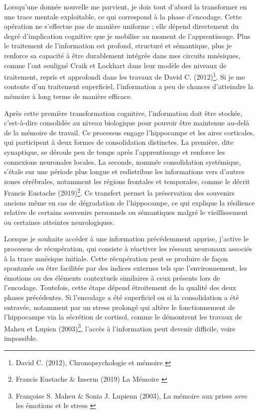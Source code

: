 \documentclass[11pt,a4paper]{report}
\begin{document}
Lorsqu’une donnée nouvelle me parvient, je dois tout d’abord la transformer en une trace mentale exploitable, ce qui correspond à la phase d’encodage. Cette opération ne s’effectue pas de manière uniforme ; elle dépend directement du degré d’implication cognitive que je mobilise au moment de l’apprentissage. Plus le traitement de l’information est profond, structuré et sémantique, plus je renforce sa capacité à être durablement intégrée dans mes circuits mnésiques, comme l’ont souligné Craik et Lockhart dans leur modèle des niveaux de traitement, repris et approfondi dans les travaux de David C. (2012)\footnote{David C. (2012), Chronopsychologie et mémoire \cite{clarys}}. Si je me contente d’un traitement superficiel, l’information a peu de chances d’atteindre la mémoire à long terme de manière efficace.

Après cette première transformation cognitive, l’information doit être stockée, c’est-à-dire consolidée au niveau biologique pour pouvoir être maintenue au-delà de la mémoire de travail. Ce processus engage l’hippocampe et les aires corticales, qui participent à deux formes de consolidation distinctes. La première, dite synaptique, se déroule peu de temps après l’apprentissage et renforce les connexions neuronales locales. La seconde, nommée consolidation systémique, s’étale sur une période plus longue et redistribue les informations vers d’autres zones cérébrales, notamment les régions frontales et temporales, comme le décrit Francis Eustache (2019)\footnote{Francis Eustache \& Inserm (2019) La Mémoire \cite{inserm}}. Ce transfert permet la préservation des souvenirs anciens même en cas de dégradation de l’hippocampe, ce qui explique la résilience relative de certains souvenirs personnels ou sémantiques malgré le vieillissement ou certaines atteintes neurologiques.

Lorsque je souhaite accéder à une information précédemment apprise, j’active le processus de récupération, qui consiste à réactiver les réseaux neuronaux associés à la trace mnésique initiale. Cette récupération peut se produire de façon spontanée ou être facilitée par des indices externes tels que l’environnement, les émotions ou des éléments contextuels similaires à ceux présents lors de l’encodage. Toutefois, cette étape dépend étroitement de la qualité des deux phases précédentes. Si l’encodage a été superficiel ou si la consolidation a été entravée, notamment par un stress prolongé qui altère le fonctionnement de l’hippocampe via la sécrétion de cortisol, comme le démontrent les travaux de Maheu et Lupien (2003)\footnote{Françoise S. Maheu \& Sonia J. Lupienn (2003), La mémoire aux prises avec les émotions et le stress \cite{maheulupienn}}, l’accès à l’information peut devenir difficile, voire impossible.
\end{document}
